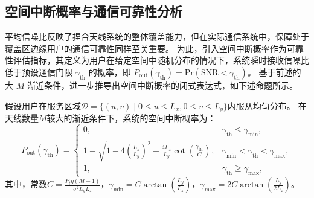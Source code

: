 \subsection{空间中断概率与通信可靠性分析}

平均信噪比反映了捏合天线系统的整体覆盖能力，但在实际通信系统中，保障处于覆盖区边缘用户的通信可靠性同样至关重要。
为此，引入空间中断概率作为可靠性评估指标，其定义为用户在给定空间中随机分布的情况下，系统瞬时接收信噪比低于预设通信门限 $\gamma_{\mathrm{th}}$ 的概率，即 $P_{\mathrm{out}}(\gamma_{\mathrm{th}}) = \mathrm{Pr}(\mathrm{SNR} < \gamma_{\mathrm{th}})$。
基于前述的大 $M$ 渐近条件，进一步推导出空间中断概率的闭式表达式，如下述命题所示。

\begin{proposition}\label{pro:pass_outage_prob}
	假设用户在服务区域$\mathcal{D} = \{ (u,v) \mid 0 \le u \le L_x, 0 \le v \le L_y \}$内服从均匀分布。
	在天线数量$M$较大的渐近条件下，系统的空间中断概率为：
	\begin{equation}\label{eq:pass_outage_prob}
		P_{\mathrm{out}}(\gamma_{\mathrm{th}}) =
		\begin{cases}
			0, & \gamma_{\mathrm{th}} \le \gamma_{\min}, \\
			1 - \sqrt{1 - 4\left(\frac{L_z}{L_y}\right)^2 + \frac{4L_z}{L_y}\cot\left(\frac{\gamma_{\mathrm{th}}}{C}\right)}, & \gamma_{\min} < \gamma_{\mathrm{th}} < \gamma_{\max}, \\
			1, & \gamma_{\mathrm{th}} \ge \gamma_{\max},
		\end{cases}
	\end{equation}
	其中，常数$C = \frac{P_t \eta (M-1)}{\sigma^2 L_y L_z}$，$\gamma_{\min} = C \arctan\left(\frac{L_y}{L_z}\right)$，$\gamma_{\max} = 2C \arctan\left(\frac{L_y}{2L_z}\right)$。
\end{proposition}

